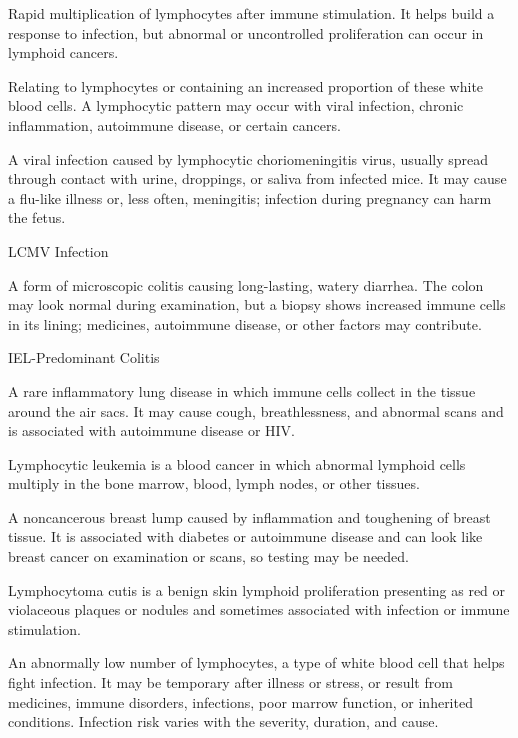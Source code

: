  Rapid multiplication of lymphocytes after immune stimulation. It helps build a response to infection, but abnormal or uncontrolled proliferation can occur in lymphoid cancers.

 Relating to lymphocytes or containing an increased proportion of these white blood cells. A lymphocytic pattern may occur with viral infection, chronic inflammation, autoimmune disease, or certain cancers.

 A viral infection caused by lymphocytic choriomeningitis virus, usually spread through contact with urine, droppings, or saliva from infected mice. It may cause a flu-like illness or, less often, meningitis; infection during pregnancy can harm the fetus.

\synonyms
LCMV Infection

 A form of microscopic colitis causing long-lasting, watery diarrhea. The colon may look normal during examination, but a biopsy shows increased immune cells in its lining; medicines, autoimmune disease, or other factors may contribute.

\synonyms
IEL-Predominant Colitis

 A rare inflammatory lung disease in which immune cells collect in the tissue around the air sacs. It may cause cough, breathlessness, and abnormal scans and is associated with autoimmune disease or HIV.

 Lymphocytic leukemia is a blood cancer in which abnormal lymphoid cells multiply in the bone marrow, blood, lymph nodes, or other tissues.

 A noncancerous breast lump caused by inflammation and toughening of breast tissue. It is associated with diabetes or autoimmune disease and can look like breast cancer on examination or scans, so testing may be needed.

 Lymphocytoma cutis is a benign skin lymphoid proliferation presenting as red or violaceous plaques or nodules and sometimes associated with infection or immune stimulation.

 An abnormally low number of lymphocytes, a type of white blood cell that helps fight infection. It may be temporary after illness or stress, or result from medicines, immune disorders, infections, poor marrow function, or inherited conditions. Infection risk varies with the severity, duration, and cause.

